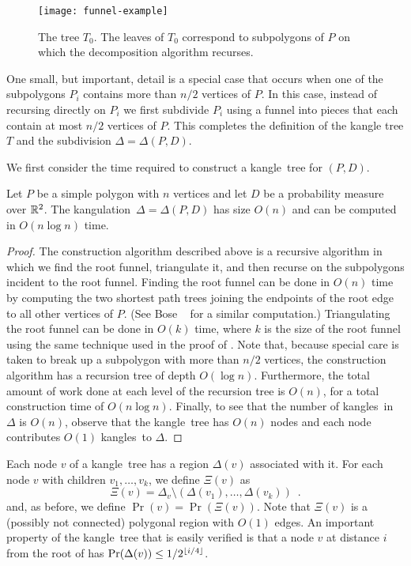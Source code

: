 \documentclass[charterfonts,lotsofwhite]{patmorin}
\newcommand{\kangle}{kangle}
\newcommand{\kangles}{kangles}
\newcommand{\kangulation}{kangulation}
\begin{document}
\begin{figure}
  \begin{center}
    \texttt{[image: funnel-example]}
  \end{center}
  \caption{The tree $T_0$.  The leaves of $T_0$ correspond to
           subpolygons of $P$ on which the decomposition algorithm recurses.}
\end{figure}

One small, but important, detail is a special case that occurs when
one of the subpolygons $P_i$ contains more than $n/2$ vertices of
$P$.  In this case, instead of recursing directly on $P_i$ we first
subdivide $P_i$ using a funnel into pieces that each contain at most
$n/2$ vertices of $P$.  This completes the definition of the kangle
tree $T$ and the subdivision $\Delta=\Delta(P,D)$. 

We first consider the time required to construct a \kangle\ tree for
$(P,D)$.  

\begin{lem}
Let $P$ be a simple polygon with $n$ vertices and let $D$ be a
probability measure over $\mathbb{R}^2$.  The \kangulation\
$\Delta=\Delta(P,D)$ has size $O(n)$ and can be computed in $O(n\log n)$
time.
\end{lem}

\begin{proof}
The construction algorithm described above is a recursive algorithm in
which we find the root funnel, triangulate it, and then recurse on the
subpolygons incident to the root funnel.  Finding the root funnel can
be done in $O(n)$ time by computing the two shortest path trees
joining the endpoints of the root edge to all other vertices of $P$.
(See Bose \etal\ \cite{geoham} for a similar computation.)
Triangulating the root funnel can be done in $O(k)$ time, where $k$ is
the size of the root funnel using the same technique used in the proof
of \lemref{upper-bound}.  Note that, because special care is taken to
break up a subpolygon with more than $n/2$ vertices, the construction
algorithm has a recursion tree of depth $O(\log n)$.  Furthermore, the
total amount of work done at each level of the recursion tree is
$O(n)$, for a total construction time of $O(n\log n)$.
Finally, to see that the number of \kangles\ in $\Delta$ is $O(n)$, observe
that the \kangle\ tree has $O(n)$ nodes and each node contributes
$O(1)$ \kangles\ to $\Delta$.
\end{proof}

Each node $v$ of a \kangle\ tree has a region $\Delta(v)$ associated
with it.  
 For each node $v$ with children $v_1,\ldots,v_k$, we define
$\Xi(v)$ as 
\[
    \Xi(v) = \Delta_v\setminus(\Delta(v_1),\ldots,\Delta(v_k)) \enspace .
\]
and, as before, we define $\Pr(v)=\Pr(\Xi(v))$.  Note that $\Xi(v)$ is
a (possibly not connected) polygonal region with $O(1)$ edges.
An important property of the \kangle\ tree that is easily verified is
that a node $v$ at
distance $i$ from the root of has $\Pr(\Delta(v)) \le 1/2^{\left\lfloor i/4 \right\rfloor}$.
\end{document}
